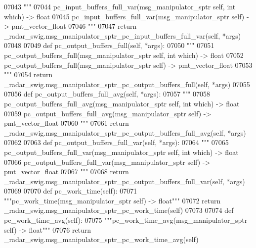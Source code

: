 \begin{DoxyCode}
{{{{{{{{{{{{{{{{{{{{{{{07043         \textcolor{stringliteral}{"""}
07044 \textcolor{stringliteral}{        pc\_input\_buffers\_full\_var(msg\_manipulator\_sptr self, int which) -> float}
07045 \textcolor{stringliteral}{        pc\_input\_buffers\_full\_var(msg\_manipulator\_sptr self) -> pmt\_vector\_float}
07046 \textcolor{stringliteral}{        """}
07047         \textcolor{keywordflow}{return} \_radar\_swig.msg\_manipulator\_sptr\_pc\_input\_buffers\_full\_var(self, *args)
07048 
07049     \textcolor{keyword}{def }pc_output_buffers_full(self, *args):
07050         \textcolor{stringliteral}{"""}
07051 \textcolor{stringliteral}{        pc\_output\_buffers\_full(msg\_manipulator\_sptr self, int which) -> float}
07052 \textcolor{stringliteral}{        pc\_output\_buffers\_full(msg\_manipulator\_sptr self) -> pmt\_vector\_float}
07053 \textcolor{stringliteral}{        """}
07054         \textcolor{keywordflow}{return} \_radar\_swig.msg\_manipulator\_sptr\_pc\_output\_buffers\_full(self, *args)
07055 
07056     \textcolor{keyword}{def }pc_output_buffers_full_avg(self, *args):
07057         \textcolor{stringliteral}{"""}
07058 \textcolor{stringliteral}{        pc\_output\_buffers\_full\_avg(msg\_manipulator\_sptr self, int which) -> float}
07059 \textcolor{stringliteral}{        pc\_output\_buffers\_full\_avg(msg\_manipulator\_sptr self) -> pmt\_vector\_float}
07060 \textcolor{stringliteral}{        """}
07061         \textcolor{keywordflow}{return} \_radar\_swig.msg\_manipulator\_sptr\_pc\_output\_buffers\_full\_avg(self, *args)
07062 
07063     \textcolor{keyword}{def }pc_output_buffers_full_var(self, *args):
07064         \textcolor{stringliteral}{"""}
07065 \textcolor{stringliteral}{        pc\_output\_buffers\_full\_var(msg\_manipulator\_sptr self, int which) -> float}
07066 \textcolor{stringliteral}{        pc\_output\_buffers\_full\_var(msg\_manipulator\_sptr self) -> pmt\_vector\_float}
07067 \textcolor{stringliteral}{        """}
07068         \textcolor{keywordflow}{return} \_radar\_swig.msg\_manipulator\_sptr\_pc\_output\_buffers\_full\_var(self, *args)
07069 
07070     \textcolor{keyword}{def }pc_work_time(self):
07071         \textcolor{stringliteral}{"""pc\_work\_time(msg\_manipulator\_sptr self) -> float"""}
07072         \textcolor{keywordflow}{return} \_radar\_swig.msg\_manipulator\_sptr\_pc\_work\_time(self)
07073 
07074     \textcolor{keyword}{def }pc_work_time_avg(self):
07075         \textcolor{stringliteral}{"""pc\_work\_time\_avg(msg\_manipulator\_sptr self) -> float"""}
07076         \textcolor{keywordflow}{return} \_radar\_swig.msg\_manipulator\_sptr\_pc\_work\_time\_avg(self)
}}}}}}}}}}}}}}}}}}}}}}}
\end{DoxyCode}
